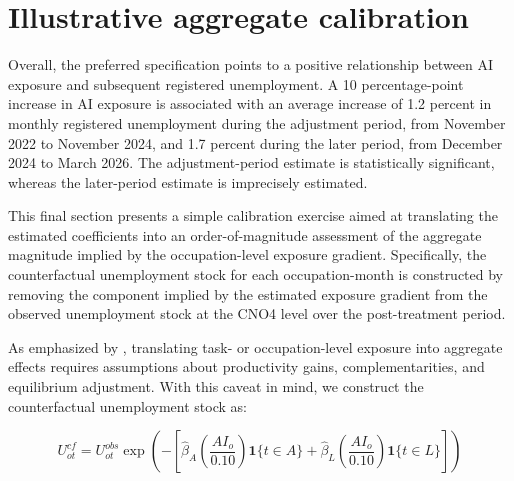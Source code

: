 \documentclass[11pt]{article}
\newcommand{\figdir}{uploads/figuresNtables}
\begin{document}
\clearpage





\clearpage
\section{Illustrative aggregate calibration}
\label{app:v1_aggregate_calibration}


Overall, the preferred specification points to a positive relationship between AI exposure and subsequent registered unemployment. A 10 percentage-point increase in AI exposure is associated with an average increase of 1.2 percent in monthly registered unemployment during the adjustment period, from November 2022 to November 2024, and 1.7 percent during the later period, from December 2024 to March 2026. The adjustment-period estimate is statistically significant, whereas the later-period estimate is imprecisely estimated.

This final section presents a simple calibration exercise aimed at translating the estimated coefficients into an order-of-magnitude assessment of the aggregate magnitude implied by the occupation-level exposure gradient. Specifically, the counterfactual unemployment stock for each occupation-month is constructed by removing the component implied by the estimated exposure gradient from the observed unemployment stock at the CNO4 level over the post-treatment period.

As emphasized by \citet{acemoglu_2025}, translating task- or occupation-level exposure into aggregate effects requires assumptions about productivity gains, complementarities, and equilibrium adjustment. With this caveat in mind, we construct the counterfactual unemployment stock as:

\begin{equation}
U^{cf}_{ot}
=
U^{obs}_{ot}
\exp\left(
-
\left[
\hat{\beta}_{A}\left(\frac{AI_o}{0.10}\right)\mathbf{1}\{t \in A\}
+
\hat{\beta}_{L}\left(\frac{AI_o}{0.10}\right)\mathbf{1}\{t \in L\}
\right]
\right)
\end{equation}
\end{document}
